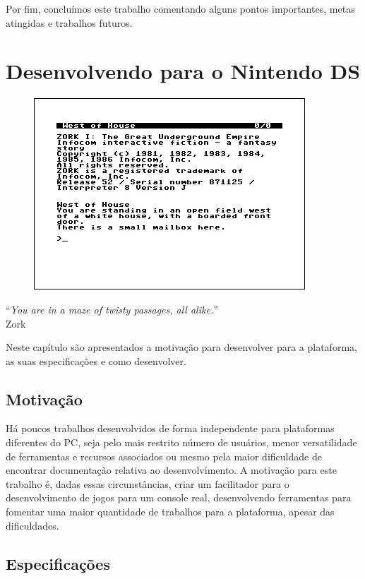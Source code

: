 \documentclass[brazil]{abnt}
\begin{document}
Por fim, concluímos este trabalho comentando alguns pontos importantes, metas atingidas e trabalhos futuros.

\chapter{Desenvolvendo para o Nintendo DS\label{cap:hardds}}

\vfill{}
\begin{flushright}{}
\begin{figure}[h!]
\hfill\includegraphics{imgs/zork_inverted.jpg}
\end{figure}
``\emph{You are in a maze of twisty passages, all alike.}''\\
{\small Zork}\end{flushright}{\small \par}
\vfill{}

Neste capítulo são apresentados a motivação para desenvolver para a plataforma, as suas especificações e como desenvolver.
\newpage

\section{Motivação}

Há poucos trabalhos desenvolvidos de forma independente para plataformas diferentes do PC, seja pelo mais restrito número de usuários, menor versatilidade de ferramentas e recursos associados ou mesmo pela maior dificuldade de encontrar documentação relativa ao desenvolvimento. A motivação para este trabalho é, dadas essas circunstâncias, criar um facilitador para o desenvolvimento de jogos para um console real, desenvolvendo ferramentas para fomentar uma maior quantidade de trabalhos para a plataforma, apesar das dificuldades.

\section{Especificações}
\end{document}
